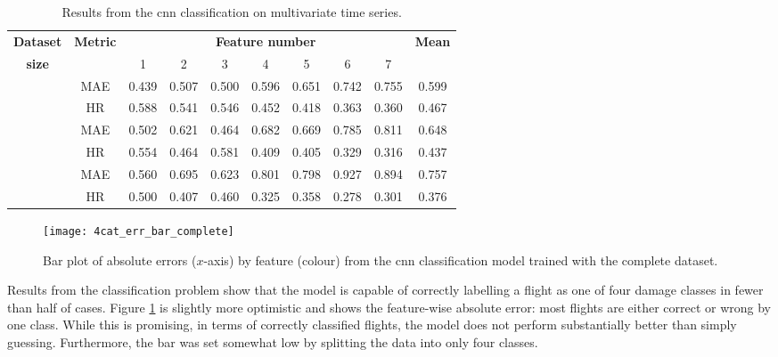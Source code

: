\begin{table}
    \renewcommand{\arraystretch}{1.4}
    \begin{center}
        \caption{\label{tab:inc:4cat} Results from the \ac{cnn} classification on multivariate time series.}
        \begin{tabular}{ >{\bfseries}c c c c c c c c c c }
            \textbf{Dataset} & \multirow{2}{*}{\textbf{Metric}} & \multicolumn{7}{c}{\textbf{Feature number}} & \multirow{2}{*}{\textbf{Mean}} \\
            size &  & 1 & 2 & 3 & 4 & 5 & 6 & 7 \\
            \midrule
            \multirow{2}{*}{Complete}   & MAE & 0.439 & 0.507 & 0.500 & 0.596 & 0.651 & 0.742 & 0.755 & 0.599 \\
                                        & HR  & 0.588 & 0.541 & 0.546 & 0.452 & 0.418 & 0.363 & 0.360 & 0.467 \\\cmidrule{2-10}
            \multirow{2}{*}{Reduced}    & MAE & 0.502 & 0.621 & 0.464 & 0.682 & 0.669 & 0.785 & 0.811 & 0.648 \\
                                        & HR  & 0.554 & 0.464 & 0.581 & 0.409 & 0.405 & 0.329 & 0.316 & 0.437 \\ \cmidrule{2-10}
            \multirow{2}{*}{Minimal}    & MAE & 0.560 & 0.695 & 0.623 & 0.801 & 0.798 & 0.927 & 0.894 & 0.757 \\
                                        & HR  & 0.500 & 0.407 & 0.460 & 0.325 & 0.358 & 0.278 & 0.301 & 0.376\\
        \end{tabular}
    \end{center}
\end{table}

\begin{figure}[tb!]
    \centering
    \texttt{[image: 4cat\_err\_bar\_complete]}
    \caption{\label{fig:classif_pred_hist} Bar plot of absolute errors (\(x\)-axis) by feature (colour) from the \ac{cnn} classification model trained with the complete dataset.}
\end{figure}

Results from the classification problem show that the model is capable of correctly labelling a flight as one of four damage classes in fewer than half of cases. Figure \ref{fig:classif_pred_hist} is slightly more optimistic and shows the feature-wise absolute error: most flights are either correct or wrong by one class. While this is promising, in terms of correctly classified flights, the model does not perform substantially better than simply guessing. Furthermore, the bar was set somewhat low by splitting the data into only four classes.

